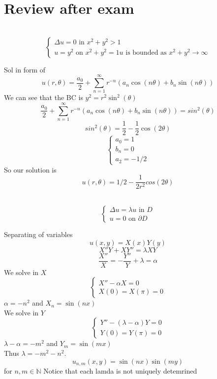 \documentclass[answers,12pt,addpoints]{exam}
\begin{document}
\newpage
\section{Review after exam}
\begin{questions}
    \\
    $$\begin{cases}
        \Delta u = 0 \text{ in } x^2+y^2 > 1\\
        u = y^2 \text{ on } x^2 + y^2 = 1
        u \text{ is bounded as } x^2 + y^2 \to \infty 
    \end{cases}$$
    \begin{solution}
        Sol in form of 
    $$ u(r, \theta) = \frac{a_0}{2} + \sum_{n=1}^\infty r^{-n} (a_n \cos(n\theta) + b_n \sin(n\theta))$$
    We can see that the BC is $y^2 = r^2 \sin^2(\theta)$
    $$ \frac{a_0}{2} + \sum_{n=1}^\infty r^{-n} (a_n \cos(n\theta) + b_n \sin(n\theta)) = sin^2(\theta) $$
    $$ sin^2(\theta) = \frac{1}{2} - \frac{1}{2} \cos(2\theta)$$
    $$\begin{cases}
        a_0 = 1\\
        b_n = 0 \\
        a_2 = -1/2
    \end{cases}
    $$
    So our solution is 
    $$u(r, \theta) = 1/2 - \frac{1}{2r^2}cos(2\theta)$$
    \end{solution}
    

    \\
    $$\begin{cases}
        \Delta u = \lambda u \text{ in } D\\
        u = 0 \text{ on } \partial D
    \end{cases}$$
    \begin{solution}
        Separating of variables\\
        $$ u(x,y) = X(x)Y(y)$$
        $$ X''Y + XY'' = \lambda XY$$
        $$ \frac{X''}{X} = - \frac{Y''}{Y} + \lambda = \alpha$$
        We solve in $X$
        $$ \begin{cases}
            X'' - \alpha X = 0\\
            X(0) = X(\pi) = 0
        \end{cases}$$
        $\alpha = -n^2$ and $X_n = \sin(nx)$\\
        We solve in $Y$
        $$ \begin{cases}
            Y'' - (\lambda - \alpha)Y = 0\\
            Y(0) = Y(\pi) = 0
        \end{cases}$$
        $\lambda - \alpha = -m^2$ and $Y_m = \sin(mx)$\\
        Thus $\lambda = -m^2 - n^2$. 
        $$ u_{n,m}(x,y) = \sin(nx) \sin(my)$$
        for $n,m \in \mathbb{N}$
        Notice that each lamda is not uniquely detemrined 
    \end{solution}


\end{questions}
\end{document}
